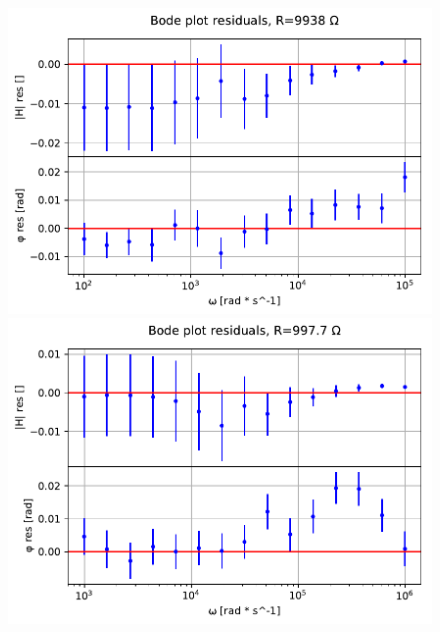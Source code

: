 \documentclass{article}
\begin{document}
\begin{figure}[h]
    \centering
    \begin{minipage}{0.5\textwidth}
        \centering
        \includegraphics[width=\textwidth]{bodeplot_res1.pdf} 
    \end{minipage}\hfill
    \begin{minipage}{0.5\textwidth}
        \centering
        \includegraphics[width=\textwidth]{bodeplot_res2.pdf} 
    \end{minipage}
    \\
    \centering
    \begin{minipage}{0.5\textwidth}
        \centering

\end{minipage}
\end{figure}
\end{document}
